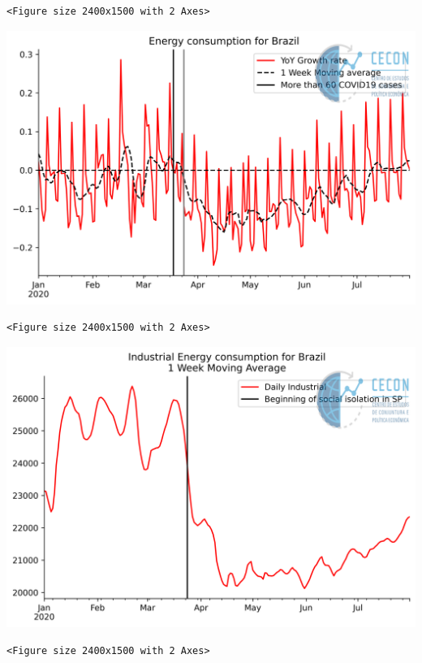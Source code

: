 \documentclass[11pt]{article}
\begin{document}
\begin{enumerate}
\begin{verbatim}
<Figure size 2400x1500 with 2 Axes>
\end{verbatim}


\begin{center}
\includegraphics[width=.9\linewidth]{obipy-resources/62e383af79e91b63c7fc98dd7fb55b3c3ececcb9/d4289bac917b4c3c16dd2a44f65ca09392f8c087.png}
\end{center}

\begin{verbatim}
<Figure size 2400x1500 with 2 Axes>
\end{verbatim}


\begin{center}
\includegraphics[width=.9\linewidth]{obipy-resources/62e383af79e91b63c7fc98dd7fb55b3c3ececcb9/bc952cb86ebe11930cccbfae0ee09821adb7b9c0.png}
\end{center}

\begin{verbatim}
<Figure size 2400x1500 with 2 Axes>
\end{verbatim}



\end{enumerate}
\end{document}
